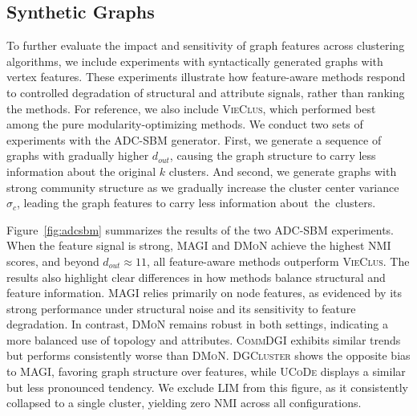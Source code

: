 \documentclass[../paper.tex]{subfiles}
\begin{document}
% 

\subsection{Synthetic Graphs}

To further evaluate the impact and sensitivity of graph features across clustering algorithms, we include experiments with syntactically generated graphs with vertex features. These experiments illustrate how feature-aware methods respond to controlled degradation of structural and attribute signals, rather than ranking the methods. For reference, we also include \textsc{VieClus}, which performed best among the pure modularity-optimizing methods. We conduct two sets of experiments with the ADC-SBM generator. First, we generate a sequence of graphs with gradually higher $d_{out}$, causing the graph structure to carry less information about the original $k$ clusters. And second, we generate graphs with strong community structure as we gradually increase the cluster center variance $\sigma_c$, leading the graph features to carry less information \hbox{about the clusters.}

Figure~\ref{fig:adcsbm} summarizes the results of the two ADC-SBM experiments. When the feature signal is strong, \textsc{MAGI} and \textsc{DMoN} achieve the highest NMI scores, and beyond $d_{out} \approx 11$, all feature-aware methods outperform \textsc{VieClus}. The results also highlight clear differences in how methods balance structural and feature information. \textsc{MAGI} relies primarily on node features, as evidenced by its strong performance under structural noise and its sensitivity to feature degradation. In contrast, \textsc{DMoN} remains robust in both settings, indicating a more balanced use of topology and attributes. \textsc{CommDGI} exhibits similar trends but performs consistently worse than \textsc{DMoN}. \textsc{DGCluster} shows the opposite bias to \textsc{MAGI}, favoring graph structure over features, while \textsc{UCoDe} displays a similar but less pronounced tendency. We exclude \textsc{LIM} from this figure, as it consistently collapsed to a single cluster, yielding zero NMI across all configurations.

\ifSubfilesClassLoaded{%
}{}
\end{document}
